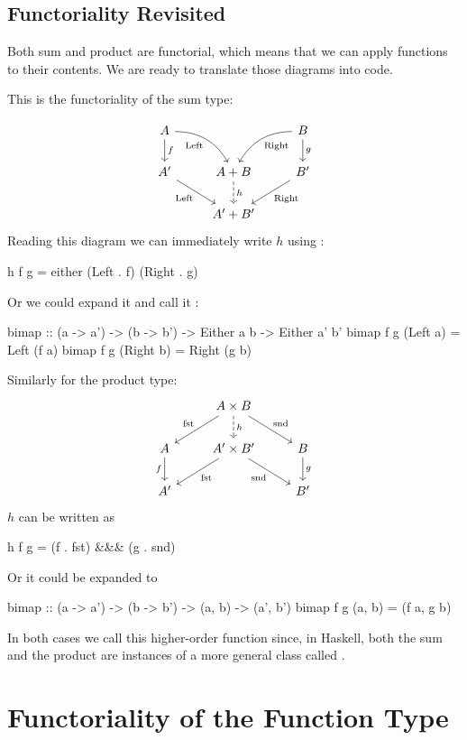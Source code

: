 \documentclass[DaoFP]{subfiles}
\begin{document}
\subsection{Functoriality Revisited}

Both sum and product are functorial, which means that we can apply functions to their contents. We are ready to translate those diagrams into code. 

This is the functoriality of the sum type:

\[
 \begin{tikzcd}
 A
 \arrow[d, "f"]
 \arrow[dr,  bend left, "\text{Left}"']
  && B
 \arrow[d, "g"]
 \arrow[dl, bend right, "\text{Right}"]
 \\
 A'
 \arrow[rd, "\text{Left}"']
&A + B
\arrow[d, dashed, "h"]
& B'
\arrow[ld, "\text{Right}"]
\\
& A' + B'
 \end{tikzcd}
\]
Reading this diagram we can immediately write $h$ using :
\begin{haskell}
h f g = either (Left . f) (Right . g)
\end{haskell}
Or we could expand it and call it :
\begin{haskell}
bimap :: (a -> a') -> (b -> b') -> Either a b -> Either a' b'
bimap f g (Left  a) = Left  (f a)
bimap f g (Right b) = Right (g b)
\end{haskell}
Similarly for the product type:
\[
 \begin{tikzcd}
 & A \times B
\arrow[d, dashed, "h"]
 \arrow[dl,  "\text{fst}"']
 \arrow[dr,   "\text{snd}"]
\\
A
\arrow[d, "f"']
&A' \times B'
 \arrow[dl,  "\text{fst}"]
  \arrow[dr,   "\text{snd}"']
& B
\arrow[d, "g"]
\\
A' && B'
 \end{tikzcd}
\]
$h$ can be written as
\begin{haskell}
h f g = (f . fst) &&& (g . snd)
\end{haskell}
Or it could be expanded to
\begin{haskell}
bimap :: (a -> a') -> (b -> b') -> (a, b) -> (a', b')
bimap f g (a, b) = (f a, g b)
\end{haskell}
In both cases we call this higher-order function  since, in Haskell, both the sum and the product are instances of a more general class called .

\section{Functoriality of the Function Type}
\end{document}
